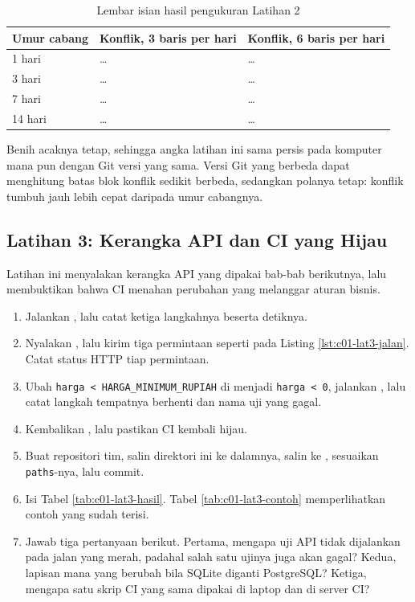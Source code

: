 \begin{table}[!htb]
  \centering
  \caption{Lembar isian hasil pengukuran Latihan 2}
  \label{tab:c01-lat2-hasil}
  \begin{tabularx}{\textwidth}{Xll}
    \hline
    \textbf{Umur cabang} & \textbf{Konflik, 3 baris per hari} & \textbf{Konflik, 6 baris per hari} \\
    \hline
    1 hari & \dots & \dots \\
    \hline
    3 hari & \dots & \dots \\
    \hline
    7 hari & \dots & \dots \\
    \hline
    14 hari & \dots & \dots \\
    \hline
  \end{tabularx}
\end{table}

Benih acaknya tetap, sehingga angka latihan ini sama persis pada komputer
mana pun dengan Git versi yang sama. Versi Git yang berbeda dapat menghitung
batas blok konflik sedikit berbeda, sedangkan polanya tetap: konflik tumbuh
jauh lebih cepat daripada umur cabangnya.

\subsection*{Latihan 3: Kerangka API dan CI yang Hijau}

Latihan ini menyalakan kerangka API yang dipakai bab-bab berikutnya, lalu
membuktikan bahwa CI menahan perubahan yang melanggar aturan bisnis.

\begin{enumerate}
  \item Jalankan , lalu catat ketiga langkahnya beserta
        detiknya.
  \item Nyalakan , lalu kirim tiga permintaan seperti
        pada Listing \ref{lst:c01-lat3-jalan}. Catat status HTTP tiap
        permintaan.
  \item Ubah \texttt{harga < HARGA\_MINIMUM\_RUPIAH} di 
        menjadi \texttt{harga < 0}, jalankan , lalu catat
        langkah tempatnya berhenti dan nama uji yang gagal.
  \item Kembalikan , lalu pastikan CI kembali hijau.
  \item Buat repositori tim, salin direktori ini ke dalamnya, salin
         ke , sesuaikan
        \texttt{paths}-nya, lalu commit.
  \item Isi Tabel \ref{tab:c01-lat3-hasil}. Tabel \ref{tab:c01-lat3-contoh}
        memperlihatkan contoh yang sudah terisi.
  \item Jawab tiga pertanyaan berikut. Pertama, mengapa uji API tidak
        dijalankan pada jalan yang merah, padahal salah satu ujinya juga
        akan gagal? Kedua, lapisan mana yang berubah bila SQLite diganti
        PostgreSQL? Ketiga, mengapa satu skrip CI yang sama dipakai di
        laptop dan di server CI?
\end{enumerate}

